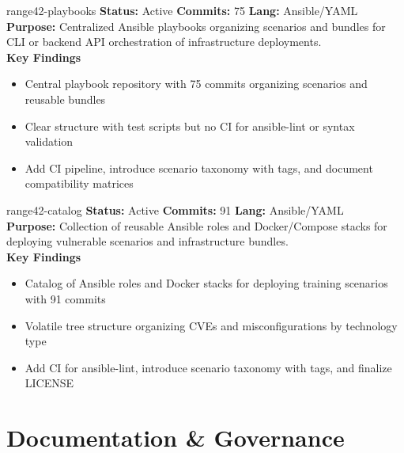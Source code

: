 \documentclass[aspectratio=169]{beamer}
\begin{document}
\begin{frame}{range42-playbooks \; \faCubes}
  \textbf{Status:} Active \hfill \textbf{Commits:} 75 \hfill \textbf{Lang:} Ansible/YAML\\[2mm]
  \textbf{Purpose:} Centralized Ansible playbooks organizing scenarios and bundles for CLI or backend API orchestration of infrastructure deployments.\\[2mm]
  \textbf{Key Findings}
  \begin{itemize}
    \item Central playbook repository with 75 commits organizing scenarios and reusable bundles
    \item Clear structure with test scripts but no CI for ansible-lint or syntax validation
    \item Add CI pipeline, introduce scenario taxonomy with tags, and document compatibility matrices
  \end{itemize}
\end{frame}

\begin{frame}{range42-catalog \; \faBoxes}
  \textbf{Status:} Active \hfill \textbf{Commits:} 91 \hfill \textbf{Lang:} Ansible/YAML\\[2mm]
  \textbf{Purpose:} Collection of reusable Ansible roles and Docker/Compose stacks for deploying vulnerable scenarios and infrastructure bundles.\\[2mm]
  \textbf{Key Findings}
  \begin{itemize}
    \item Catalog of Ansible roles and Docker stacks for deploying training scenarios with 91 commits
    \item Volatile tree structure organizing CVEs and misconfigurations by technology type
    \item Add CI for ansible-lint, introduce scenario taxonomy with tags, and finalize LICENSE
  \end{itemize}
\end{frame}

\section{Documentation \& Governance}
\end{document}
